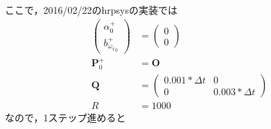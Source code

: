 ここで，2016/02/22のhrpsysの実装では
\begin{align}
  \begin{pmatrix}
    \alpha_{0}^{+}\\
    b_{{\omega_x}_{0}}^{+}
  \end{pmatrix} &=
  \begin{pmatrix}
    0\\
    0
  \end{pmatrix}\\
  \boldsymbol{P}_{0}^{+} &= \boldsymbol{O}\\
  \boldsymbol{Q} &=
  \begin{pmatrix}
    0.001 * \Delta t & 0\\
    0 & 0.003 * \Delta t
  \end{pmatrix}\\
  R &= 1000
\end{align}
なので，1ステップ進めると
